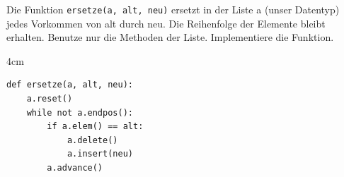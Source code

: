 \question[3]
Die Funktion \texttt{ersetze(a, alt, neu)} ersetzt in der Liste a (unser Datentyp) jedes Vorkommen von alt durch neu.
Die Reihenfolge der Elemente bleibt erhalten. Benutze nur die Methoden der Liste. Implementiere die Funktion.
\begin{solutionbox}{4cm}
\begin{lstlisting}
def ersetze(a, alt, neu):
    a.reset()
    while not a.endpos():
        if a.elem() == alt:
            a.delete()
            a.insert(neu)
        a.advance()
\end{lstlisting}
\end{solutionbox}
